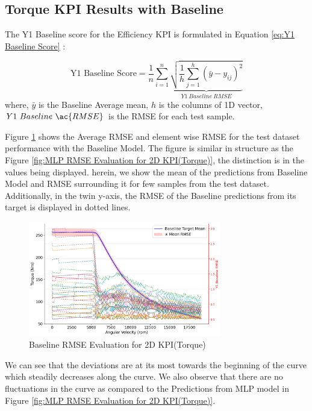 \documentclass{report} %
\begin{document}
\subsection{Torque \ac{KPI} Results with Baseline}\label{sec:3D Efficiency Grid Results with Baseline}

The Y1 Baseline score for the Efficiency \ac{KPI} is formulated in Equation \ref{eq:Y1 Baseline Score} :

\begin{equation}
    \text{Y1 Baseline Score} = \frac{1}{n} \sum_{i=1}^{n} \underbrace{ \sqrt{\frac{1}{h} \sum_{j=1}^{h} (\bar{y} - y_{ij})^2}}_{Y1\ Baseline\ RMSE}
    \label{eq:Y1 Baseline Score}
\end{equation}
where, \(\bar{y}\) is the Baseline Average mean, \(h\) is the columns of 1D vector, \(Y1\ Baseline\ \ac{RMSE}\) is the \ac{RMSE} for each test sample.

Figure \ref{fig:Baseline RMSE Evaluation for 2D KPI(Torque)} shows the Average \ac{RMSE} and element wise \ac{RMSE} for the test dataset performance with the 
Baseline Model. The figure is similar in structure as the Figure \ref{fig:MLP RMSE Evaluation for 2D KPI(Torque)}, the distinction is in the values being displayed. 
herein, we show the mean of the predictions from Baseline Model and \ac{RMSE} surrounding it for few samples from the test dataset. Additionally, in the twin y-axis, 
the \ac{RMSE} of the Baseline predictions from its target is displayed in dotted lines.

\begin{figure}[H]
    \centering
    \includegraphics[width=0.75\textwidth]{./ReportImages/RMSE_Baseline_y1.png} 
    \caption{Baseline \ac{RMSE} Evaluation for 2D KPI(Torque)} 
    \label{fig:Baseline RMSE Evaluation for 2D KPI(Torque)}
\end{figure}

We can see that the deviations are at its most towards the beginning of the curve which steadily decreases along the curve. We also observe that there are no 
fluctuations in the curve as compared to the Predictions from \ac{MLP} model in Figure \ref{fig:MLP RMSE Evaluation for 2D KPI(Torque)}.
\end{document}
